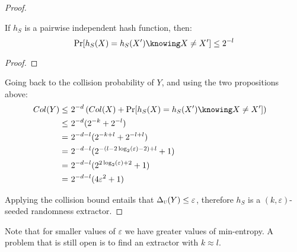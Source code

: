 \begin{proof}
    \begin{proposition}
        If $h_S$ is a pairwise independent hash function, then:
        \[
            \Pr[h_S(X) = h_S(X') \knowing X \neq X'] \leq 2^{-l}
        \]
    \end{proposition}
    
    \begin{proof}
    \end{proof}

    Going back to the collision probability of $Y$, and using the two propositions above:
    \begin{align*}
        Col(Y) \leq&\ 2^{-d} \left( Col(X) + \Pr[h_S(X) = h_S(X') \knowing X \neq X'] \right) & \\
               \leq&\ 2^{-d} (2^{-k} + 2^{-l}) & \\
                  =&\ 2^{-d - l} (2^{-k + l} + 2^{-l + l}) & \\
                  =&\ 2^{-d - l} (2^{-(l - 2 \log_2(\varepsilon) - 2) + l} + 1)  & \\
                  =&\ 2^{-d - l} (2^{2 \log_2(\varepsilon) + 2} + 1)  & \\
                  =&\ 2^{-d - l} (4\varepsilon^2 + 1) & \\
    \end{align*}

    Applying the collision bound entails that $\Delta_\textsc{u}(Y) \leq \varepsilon$, therefore $h_S$ is a $(k, \varepsilon)$-seeded randomness extractor.
\end{proof}

Note that for smaller values of $\varepsilon$ we have greater values of min-entropy. A problem that is still open is to find an extractor with $k \approx l$.
